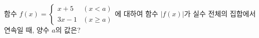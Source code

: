 함수 $f(x)=\begin{cases} x+5 & (x<a) \\ 3x-1 & (x\ge a) \end{cases}$에 대하여 함수 $|f(x)|$가 실수 전체의 집합에서 연속일 때, 양수 $a$의 값은?
